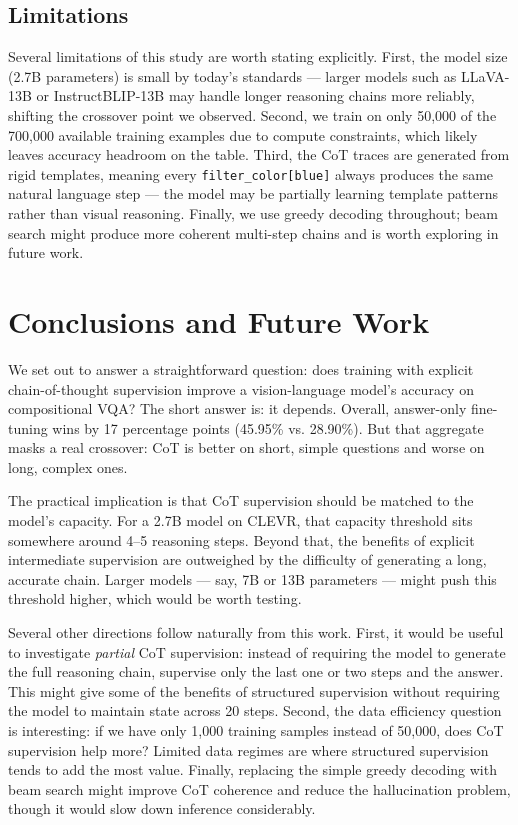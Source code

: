 \documentclass[11pt,twocolumn]{article}
\begin{document}
\subsection{Limitations}

Several limitations of this study are worth stating explicitly. First, the model size (2.7B parameters) is small by today's standards — larger models such as LLaVA-13B or InstructBLIP-13B may handle longer reasoning chains more reliably, shifting the crossover point we observed. Second, we train on only 50,000 of the 700,000 available training examples due to compute constraints, which likely leaves accuracy headroom on the table. Third, the CoT traces are generated from rigid templates, meaning every \texttt{filter\_color[blue]} always produces the same natural language step — the model may be partially learning template patterns rather than visual reasoning. Finally, we use greedy decoding throughout; beam search might produce more coherent multi-step chains and is worth exploring in future work.

\section{Conclusions and Future Work}

We set out to answer a straightforward question: does training with explicit chain-of-thought supervision improve a vision-language model's accuracy on compositional VQA? The short answer is: it depends. Overall, answer-only fine-tuning wins by 17 percentage points (45.95\% vs. 28.90\%). But that aggregate masks a real crossover: CoT is better on short, simple questions and worse on long, complex ones.

The practical implication is that CoT supervision should be matched to the model's capacity. For a 2.7B model on CLEVR, that capacity threshold sits somewhere around 4--5 reasoning steps. Beyond that, the benefits of explicit intermediate supervision are outweighed by the difficulty of generating a long, accurate chain. Larger models — say, 7B or 13B parameters — might push this threshold higher, which would be worth testing.

Several other directions follow naturally from this work. First, it would be useful to investigate \textit{partial} CoT supervision: instead of requiring the model to generate the full reasoning chain, supervise only the last one or two steps and the answer. This might give some of the benefits of structured supervision without requiring the model to maintain state across 20 steps. Second, the data efficiency question is interesting: if we have only 1,000 training samples instead of 50,000, does CoT supervision help more? Limited data regimes are where structured supervision tends to add the most value. Finally, replacing the simple greedy decoding with beam search might improve CoT coherence and reduce the hallucination problem, though it would slow down inference considerably.
\end{document}
